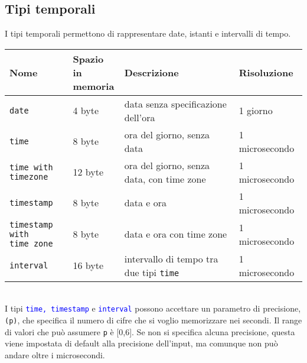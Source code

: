 \documentclass[12pt,a4paper]{book}
\begin{document}
	\subsection{Tipi temporali}
	I tipi temporali permettono di rappresentare date, istanti e intervalli di tempo.\vspace{10px}\\
	\setlength{\tabcolsep}{5pt}
	\renewcommand{\arraystretch}{2.0}
	\begin{tabular}{| l | l | l | l |}
		\hline
		Nome & \makecell{Spazio in\\ memoria} & Descrizione & Risoluzione\\
		\hline
		\texttt{date} & 4 byte & data senza specificazione dell'ora & 1 giorno \\
		\texttt{time} & 8 byte & ora del giorno, senza data& 1 microsecondo\\
		\makecell[l]{\texttt{time with}\\ \texttt{timezone}} & 12 byte & ora del giorno, senza data, con time zone & 1 microsecondo \\
		\texttt{timestamp} & 8 byte & data e ora & 1 microsecondo\\
		\makecell[l]{\texttt{timestamp with}\\ \texttt{time zone}} & 8 byte & data e ora con time zone & 1 microsecondo\\
		\texttt{interval} & 16 byte & intervallo di tempo tra due tipi \texttt{time} & 1 microsecondo \\
		\hline
	\end{tabular}\vspace{10px}\\
	\renewcommand{\arraystretch}{2.0}	
	I tipi \textcolor{blue}{\texttt{time, timestamp}} e \textcolor{blue}{\texttt{interval}} possono accettare un parametro di precisione, \texttt{(p)}, che specifica il numero di cifre che si voglio memorizzare nei secondi. Il range di valori che può assumere \texttt{p} è [0,6]. Se non si specifica alcuna precisione, questa viene impostata di default alla precisione dell'input, ma comunque non può andare oltre i microsecondi.\\
\end{document}
